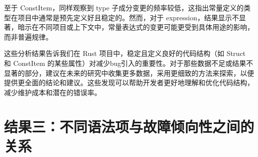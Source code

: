 至于 ConstItem，同样观察到 type 子成分变更的频率较低，这指出常量定义的类型在项目中通常是预先定义好且稳定的。然而，对于 expression，结果显示不显著，暗示在不同项目或上下文中，常量表达式的变更可能更受到具体用途的影响，而非普遍规律。

这些分析结果告诉我们在 Rust 项目中，稳定且定义良好的代码结构（如 Struct 和 ConstItem 的某些属性）对减少bug引入的重要性。对于那些数据不足或结果不显著的部分，建议在未来的研究中收集更多数据，采用更细致的方法来探索，以便提供更全面的结论和建议。这些发现可以帮助开发者更好地理解和优化代码结构，减少维护成本和潜在的错误率。

\section{结果三：不同语法项与故障倾向性之间的关系}

